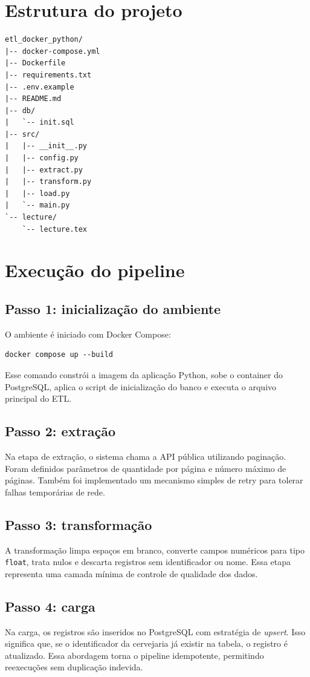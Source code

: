 \documentclass[12pt,a4paper]{article}
\begin{document}
\section{Estrutura do projeto}
\begin{lstlisting}
etl_docker_python/
|-- docker-compose.yml
|-- Dockerfile
|-- requirements.txt
|-- .env.example
|-- README.md
|-- db/
|   `-- init.sql
|-- src/
|   |-- __init__.py
|   |-- config.py
|   |-- extract.py
|   |-- transform.py
|   |-- load.py
|   `-- main.py
`-- lecture/
    `-- lecture.tex
\end{lstlisting}

\section{Execução do pipeline}
\subsection{Passo 1: inicialização do ambiente}
O ambiente é iniciado com Docker Compose:

\begin{lstlisting}
docker compose up --build
\end{lstlisting}

Esse comando constrói a imagem da aplicação Python, sobe o container do PostgreSQL, aplica o script de inicialização do banco e executa o arquivo principal do ETL.

\subsection{Passo 2: extração}
Na etapa de extração, o sistema chama a API pública utilizando paginação. Foram definidos parâmetros de quantidade por página e número máximo de páginas. Também foi implementado um mecanismo simples de retry para tolerar falhas temporárias de rede.

\subsection{Passo 3: transformação}
A transformação limpa espaços em branco, converte campos numéricos para tipo \texttt{float}, trata nulos e descarta registros sem identificador ou nome. Essa etapa representa uma camada mínima de controle de qualidade dos dados.

\subsection{Passo 4: carga}
Na carga, os registros são inseridos no PostgreSQL com estratégia de \textit{upsert}. Isso significa que, se o identificador da cervejaria já existir na tabela, o registro é atualizado. Essa abordagem torna o pipeline idempotente, permitindo reexecuções sem duplicação indevida.
\end{document}

